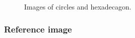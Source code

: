 \documentclass[twoside]{article}
\begin{document}
\begin{figure}
	\centering
	\caption[Images of circles and hexadecagon.]{Images of circles and hexadecagon.}
	\label{fig:Images of circles and hexadecagon}
\end{figure}




\subsubsection{Reference image}
\label{sec:Reference image}
\end{document}
